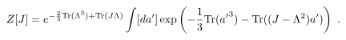 \begin{equation}
Z[J]=e^{-\frac{2}{3}\mathrm{Tr}(\Lambda^3) + \mathrm{Tr} (J\Lambda)} \int [d{%
a}^{\prime}] \exp\left( -\frac{1}{3}\mbox{Tr}({{a}^{\prime}}^3) - \mbox{Tr}%
((J-\Lambda^2){a}^{\prime}) \right)\,\,.
\end{equation}

